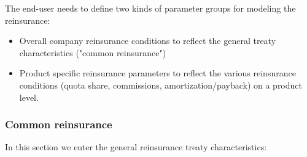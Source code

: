 The end-user needs to define two kinds of parameter groups for modeling the reinsurance:
\begin{itemize}
	\item	Overall company reinsurance conditions to reflect the general treaty characteristics ("common reinsurance")
	\item 	Product specific reinsurance parameters to reflect the various reinsurance conditions (quota share, commissions, amortization/payback) on a product level.
\end{itemize}

\subsubsection{Common reinsurance}

In this section we enter the general reinsurance treaty characteristics:

